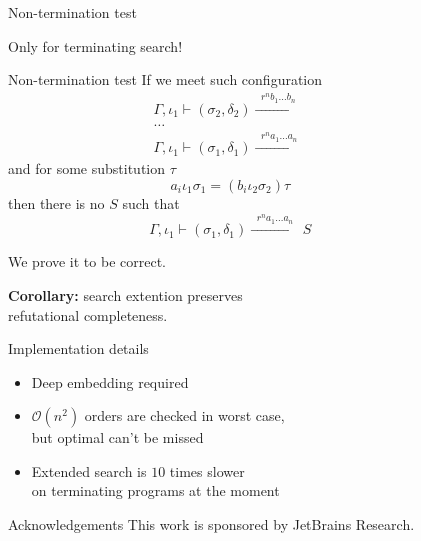 \documentclass[final,20pt]{beamer}
\newcommand{\Xrightarrow}[1]{\xrightarrow{\phantom{x}#1\phantom{x}}}
\begin{document}
\begin{frame}[t]
\begin{columns}[t]
\begin{column}{\onecolwid}
\begin{block}{Non-termination test}
      \begin{center} Only for terminating search! \end{center}
      \begin{exampleblock}{Non-termination test}
        If we meet such configuration
        \[
          \begin{array}{c}
            \Gamma, \iota_1 \vdash (\sigma_2, \delta_2) \Xrightarrow{r^n b_1 \dots b_n} \\
            \ldots \\
            \Gamma, \iota_1 \vdash (\sigma_1, \delta_1) \Xrightarrow{r^n a_1 \dots a_n}
          \end{array}
        \]
        and for some substitution $\tau$
        \[ a_i \iota_1 \sigma_1 = (b_i \iota_2 \sigma_2) \tau \]
        then there is no $S$ such that
        \[ \Gamma, \iota_1 \vdash (\sigma_1, \delta_1) \Xrightarrow{r^n a_1 \dots a_n} S \]
      \end{exampleblock}
      We prove it to be correct.
      
      \textbf{Corollary:} search extention preserves \\ refutational completeness.
    \end{block}
    
    \begin{block}{Implementation details}
      \begin{itemize}
        \item Deep embedding required
        \item $\mathcal{O}(n^2)$ orders are checked in worst case, \\ but optimal can't be missed
        \item Extended search is $10$ times slower \\ on terminating programs at the moment
      \end{itemize}
    \end{block}
    
    \begin{block}{Acknowledgements}
      This work is sponsored by JetBrains Research.
    \end{block}

  \end{column}
  
  \begin{column}{\sepwid}\end{column} %
\end{columns}

\end{frame} %
\end{document}
